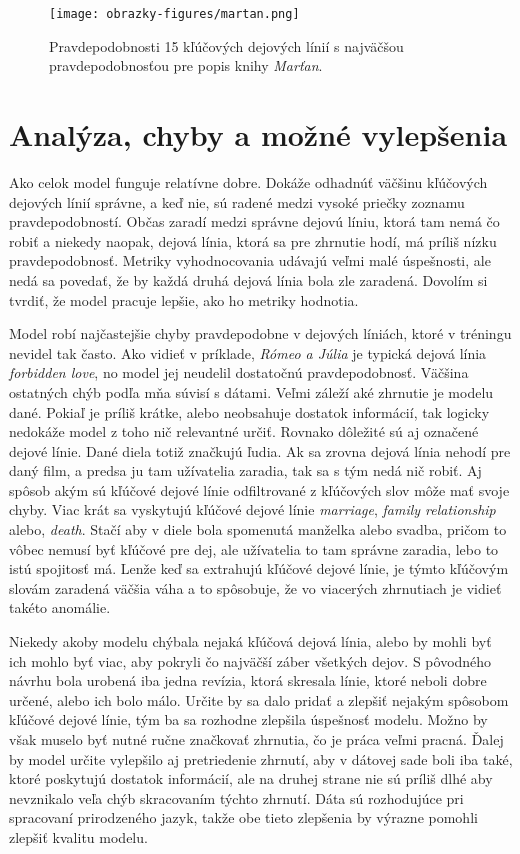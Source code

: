 \begin{figure}[ht!]
	\centering
	\texttt{[image: obrazky-figures/martan.png]}
	\caption{Pravdepodobnosti 15 kľúčových dejových línií s najväčšou pravdepodobnosťou pre popis knihy \textit{Marťan}.}
	\label{martan}
\end{figure}

\pagebreak
\section{Analýza, chyby a možné vylepšenia}

Ako celok model funguje relatívne dobre. Dokáže odhadnúť väčšinu kľúčových dejových línií správne, a keď nie, sú radené medzi vysoké priečky zoznamu pravdepodobností. Občas zaradí medzi správne dejovú líniu, ktorá tam nemá čo robiť a niekedy naopak, dejová línia, ktorá sa pre zhrnutie hodí, má príliš nízku pravdepodobnosť. Metriky vyhodnocovania udávajú veľmi malé úspešnosti, ale nedá sa povedať, že by každá druhá dejová línia bola zle zaradená. Dovolím si tvrdiť, že model pracuje lepšie, ako ho metriky hodnotia. 

Model robí najčastejšie chyby pravdepodobne v dejových líniách, ktoré v tréningu nevidel tak často. Ako vidieť v príklade, \textit{Rómeo a Júlia} je typická dejová línia \textit{forbidden love}, no model jej neudelil dostatočnú pravdepodobnosť. Väčšina ostatných chýb podľa mňa súvisí s dátami. Veľmi záleží aké zhrnutie je modelu dané. Pokiaľ je príliš krátke, alebo neobsahuje dostatok informácií, tak logicky nedokáže model z toho nič relevantné určiť. Rovnako dôležité sú aj označené dejové línie. Dané diela totiž značkujú ľudia. Ak sa zrovna dejová línia nehodí pre daný film, a predsa ju tam užívatelia zaradia, tak sa s tým nedá nič robiť. Aj spôsob akým sú kľúčové dejové línie odfiltrované z kľúčových slov môže mať svoje chyby. Viac krát sa vyskytujú kľúčové dejové línie \textit{marriage}, \textit{family relationship} alebo,
\textit{death}. Stačí aby v diele bola spomenutá manželka alebo svadba, pričom to vôbec nemusí byť kľúčové pre dej, ale užívatelia to tam správne zaradia, lebo to istú spojitosť má. Lenže keď sa extrahujú kľúčové dejové línie, je týmto kľúčovým slovám zaradená väčšia váha a to spôsobuje, že vo viacerých zhrnutiach je vidieť takéto anomálie. 

Niekedy akoby modelu chýbala nejaká kľúčová dejová línia, alebo by mohli byť ich mohlo byť viac, aby pokryli čo najväčší záber všetkých dejov. S pôvodného návrhu bola urobená iba jedna revízia, ktorá skresala línie, ktoré neboli dobre určené, alebo ich bolo málo. Určite by sa dalo pridať a zlepšiť nejakým spôsobom kľúčové dejové línie, tým ba sa rozhodne zlepšila úspešnosť modelu. Možno by však muselo byť nutné ručne značkovať zhrnutia, čo je práca veľmi pracná. Ďalej by model určite vylepšilo aj pretriedenie zhrnutí, aby v dátovej sade boli iba také, ktoré poskytujú dostatok informácií, ale na druhej strane nie sú príliš dlhé aby nevznikalo veľa chýb skracovaním týchto zhrnutí. Dáta sú rozhodujúce pri spracovaní prirodzeného jazyk, takže obe tieto zlepšenia by výrazne pomohli zlepšiť kvalitu modelu.

